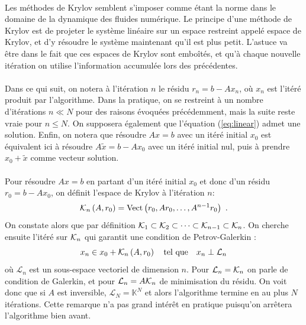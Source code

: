     \paragraph{}
    Les méthodes de Krylov semblent s'imposer comme étant la norme dans le domaine de la dynamique des fluides numérique.
    Le principe d'une méthode de Krylov est de projeter le système linéaire sur un espace restreint appelé espace de Krylov, et d'y résoudre le système maintenant qu'il est plus petit.
		L'astuce va être dans le fait que ces espaces de Krylov sont emboîtés, et qu'à chaque nouvelle itération on utilise l'information accumulée lors des précédentes.

		\paragraph{}
		Dans ce qui suit, on notera à l'itération $n$ le résidu $r_n = b - Ax_n$, où $x_n$ est l'itéré produit par l'algorithme.
		Dans la pratique, on se restreint à un nombre d'itérations $n\ll N$ pour des raisons évoquées précédemment, mais la suite reste vraie pour $n\le N$.
		On supposera également que l'équation (\ref{eq:linear}) admet une solution.
		Enfin, on notera que résoudre $Ax = b$ avec un itéré initial $x_0$ est équivalent ici à résoudre $A\tilde{x} = b - Ax_0$ avec un itéré initial nul, puis à prendre $x_0 + \tilde{x}$ comme vecteur solution.

		\paragraph{}
		Pour résoudre $Ax = b$ en partant d'un itéré initial $x_0$ et donc d'un résidu $r_0 = b - Ax_0$, on définit l'espace de Krylov à l'itération $n$:
		\begin{equation}\label{eqn:krylov}
			\krylov[A, r_0]{n} = \operatorname{Vect}\left(r_0, Ar_0, \dots, A^{n-1}r_0\right)\ .
		\end{equation}
		On constate alors que par définition $\krylov{1}\subset\krylov{2}\subset\dots\subset\krylov{n-1}\subset\krylov{n}$.
		On cherche ensuite l'itéré sur $\krylov{n}$ qui garantit une condition de Petrov-Galerkin \cite{SimonciniSzyld2007} :
		\begin{equation}\label{eqn:x_n}
			x_n \in x_0 + \krylov[A, r_0]{n}\quad\textrm{tel que}\quad x_n \perp \mathcal{L}_n
		\end{equation}
		où $\mathcal{L}_n$ est un sous-espace vectoriel de dimension $n$.
		Pour $\mathcal{L}_n = \krylov{n}$ on parle de condition de Galerkin, et pour $\mathcal{L}_n = A\krylov{n}$ de minimisation du résidu.
		On voit donc que si $A$ est inversible, $\mathcal{L}_N = \mathbb{K}^N$ et alors l'algorithme termine en au plus $N$ itérations.
		Cette remarque n'a pas grand intérêt en pratique puisqu'on arrêtera l'algorithme bien avant.

